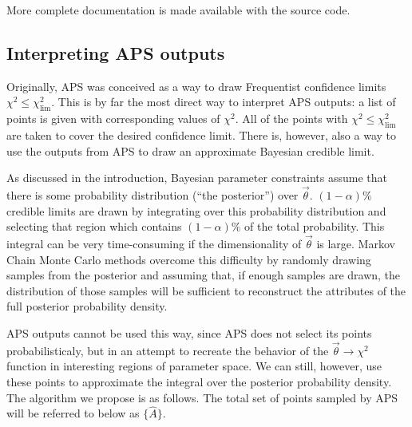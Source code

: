 \documentclass[useAMS,usenatbib]{aastex}
\begin{document}
More complete documentation is made available with the source code.


\subsection{Interpreting APS outputs}
\label{sec:bayes}

Originally, APS was conceived as a way to draw Frequentist confidence limits $\chi^2\le\chi^2_\text{lim}$. 
This is by far the most direct way to interpret APS outputs: a list of points is given with
corresponding values of $\chi^2$.  All of the points with $\chi^2\le\chi^2_\text{lim}$ are
taken to cover the desired confidence limit.  There is, however, also a way to use the
outputs from APS to draw an approximate Bayesian credible limit.

As discussed in the introduction, Bayesian parameter constraints assume that there is some
probability distribution (``the posterior'') over $\vec{\theta}$.  
$(1-\alpha)\%$ credible limits are drawn by
integrating over this probability distribution and selecting that region which contains
$(1-\alpha)\%$ of the total probability.  This integral can be very time-consuming if the
dimensionality of $\vec{\theta}$ is large.  Markov Chain Monte Carlo methods overcome this
difficulty by randomly drawing samples from the posterior and assuming that, if enough samples
are drawn, the distribution of those samples will be sufficient to reconstruct the attributes
of the full posterior probability density.

APS outputs cannot be used this way, since APS does not select its points
probabilisticaly, but in an attempt to recreate the behavior of the 
$\vec{\theta}\rightarrow\chi^2$ function in
interesting regions of parameter space.  We can still, however, use these points to approximate
the integral over the posterior probability density.  The algorithm we propose is as follows.
The total set of points sampled by APS will be referred to below as $\{\hat{A}\}$.
\end{document}

